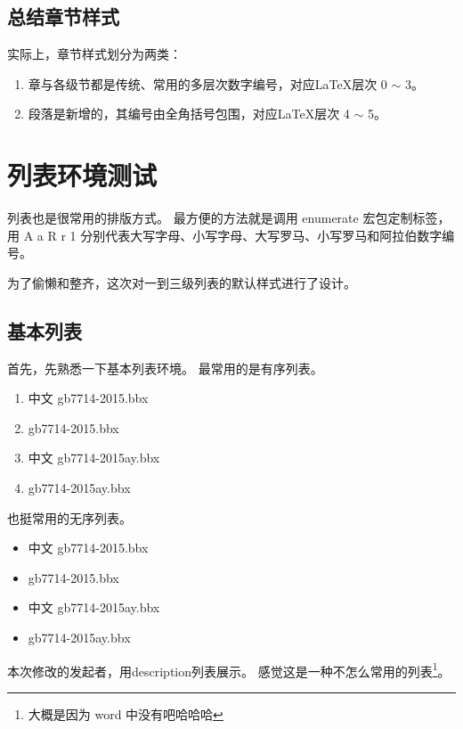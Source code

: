 \documentclass[../Main/thesis]{subfiles}
\begin{document}
\subsection{总结章节样式}
\label{ssc:summary-title-formats}

实际上，章节样式划分为两类：
\begin{enumerate}[(1)]
  \item 章与各级节都是传统、常用的多层次数字编号，对应\LaTeX 层次 0 $\sim$ 3。
  \item 段落是新增的，其编号由全角括号包围，对应\LaTeX 层次 4 $\sim$ 5。
\end{enumerate}

\section{列表环境测试} \label{sec:list}

列表也是很常用的排版方式。
最方便的方法就是调用 enumerate 宏包定制标签，用 A a R r 1 分别代表大写字母、小写字母、大写罗马、小写罗马和阿拉伯数字编号。

为了偷懒和整齐，这次对一到三级列表的默认样式进行了设计。

\subsection{基本列表} \label{ssc:basiclist}

首先，先熟悉一下基本列表环境。
最常用的是有序列表。

\begin{enumerate}
  \item 中文 gb7714-2015.bbx
  \item gb7714-2015.bbx
  \item 中文 gb7714-2015ay.bbx
  \item gb7714-2015ay.bbx
\end{enumerate}

也挺常用的无序列表。

\begin{itemize}
  \item 中文 gb7714-2015.bbx
  \item gb7714-2015.bbx
  \item 中文 gb7714-2015ay.bbx
  \item gb7714-2015ay.bbx
\end{itemize}

本次修改的发起者，用description列表展示。
感觉这是一种不怎么常用的列表\footnote{大概是因为 word 中没有吧哈哈哈}。
\end{document}
